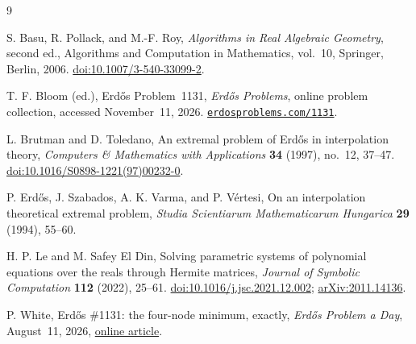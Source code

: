 \documentclass[11pt,leqno]{amsart}
\theoremstyle{definition}
\theoremstyle{remark}
\numberwithin{equation}{section}
\begin{document}
\begin{thebibliography}{9}

S. Basu, R. Pollack, and M.-F. Roy,
\textit{Algorithms in Real Algebraic Geometry}, second ed.,
Algorithms and Computation in Mathematics, vol.~10,
Springer, Berlin, 2006.
\href{https://doi.org/10.1007/3-540-33099-2}{doi:10.1007/3-540-33099-2}.

T. F. Bloom (ed.), Erd\H{o}s Problem~1131,
\textit{Erd\H{o}s Problems}, online problem collection,
accessed November~11, 2026.
\href{https://www.erdosproblems.com/1131}{\nolinkurl{erdosproblems.com/1131}}.

L. Brutman and D. Toledano,
An extremal problem of Erd\H{o}s in interpolation theory,
\textit{Computers \& Mathematics with Applications} \textbf{34}
(1997), no.~12, 37--47.
\href{https://doi.org/10.1016/S0898-1221(97)00232-0}{doi:10.1016/S0898-1221(97)00232-0}.

P. Erd\H{o}s, J. Szabados, A. K. Varma, and P. V\'ertesi,
On an interpolation theoretical extremal problem,
\textit{Studia Scientiarum Mathematicarum Hungarica} \textbf{29}
(1994), 55--60.

H. P. Le and M. Safey El Din,
Solving parametric systems of polynomial equations over the reals
through Hermite matrices,
\textit{Journal of Symbolic Computation} \textbf{112} (2022), 25--61.
\href{https://doi.org/10.1016/j.jsc.2021.12.002}{doi:10.1016/j.jsc.2021.12.002};
\href{https://arxiv.org/abs/2011.14136}{arXiv:2011.14136}.

P. White, Erd\H{o}s \#1131: the four-node minimum, exactly,
\textit{Erd\H{o}s Problem a Day}, August~11, 2026,
\href{https://erdosproblemaday.com/day/1131-exact-four-node-minimum}{online article}.

\end{thebibliography}
\end{document}
